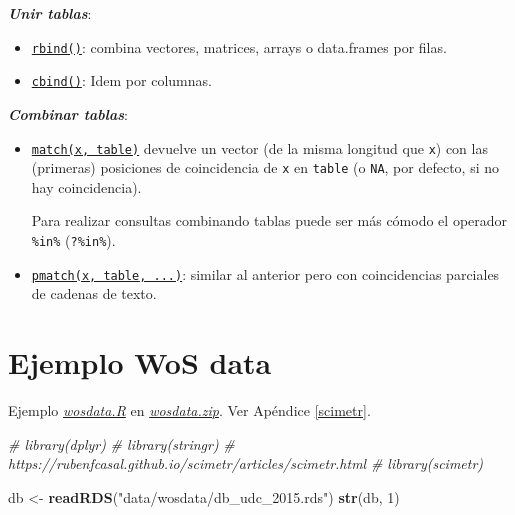 \documentclass[]{book}
\newenvironment{Shaded}{\begin{snugshade}}{\end{snugshade}}
\newcommand{\KeywordTok}[1]{\textcolor[rgb]{0.13,0.29,0.53}{\textbf{#1}}}
\newcommand{\DecValTok}[1]{\textcolor[rgb]{0.00,0.00,0.81}{#1}}
\newcommand{\StringTok}[1]{\textcolor[rgb]{0.31,0.60,0.02}{#1}}
\newcommand{\CommentTok}[1]{\textcolor[rgb]{0.56,0.35,0.01}{\textit{#1}}}
\newcommand{\NormalTok}[1]{#1}
\begin{document}
\textbf{\emph{Unir tablas}}:

\begin{itemize}
\item
  \href{https://www.rdocumentation.org/packages/base/versions/3.6.1/topics/rbind}{\texttt{rbind()}}:
  combina vectores, matrices, arrays o data.frames por filas.
\item
  \href{https://www.rdocumentation.org/packages/base/versions/3.6.1/topics/cbind}{\texttt{cbind()}}:
  Idem por columnas.
\end{itemize}

\textbf{\emph{Combinar tablas}}:

\begin{itemize}
\item
  \href{https://www.rdocumentation.org/packages/base/versions/3.6.1/topics/match}{\texttt{match(x,\ table)}}
  devuelve un vector (de la misma longitud que \texttt{x}) con las
  (primeras) posiciones de coincidencia de \texttt{x} en \texttt{table}
  (o \texttt{NA}, por defecto, si no hay coincidencia).

  Para realizar consultas combinando tablas puede ser más cómodo el
  operador \texttt{\%in\%}
  (\texttt{?\textquotesingle{}\%in\%\textquotesingle{}}).
\item
  \href{https://www.rdocumentation.org/packages/base/versions/3.6.1/topics/pmatch}{\texttt{pmatch(x,\ table,\ ...)}}:
  similar al anterior pero con coincidencias parciales de cadenas de
  texto.
\end{itemize}

\section{Ejemplo WoS data}\label{ejemplo-wos-data}

Ejemplo \href{data/wosdata.R}{\emph{wosdata.R}} en
\href{data/wosdata.zip}{\emph{wosdata.zip}}. Ver Apéndice \ref{scimetr}.

\begin{Shaded}
\begin{Highlighting}[]
\CommentTok{# library(dplyr)}
\CommentTok{# library(stringr)}
\CommentTok{# https://rubenfcasal.github.io/scimetr/articles/scimetr.html}
\CommentTok{# library(scimetr)}

\NormalTok{db <-}\StringTok{ }\KeywordTok{readRDS}\NormalTok{(}\StringTok{"data/wosdata/db_udc_2015.rds"}\NormalTok{)}
\KeywordTok{str}\NormalTok{(db, }\DecValTok{1}\NormalTok{)}
\end{Highlighting}
\end{Shaded}
\end{document}
